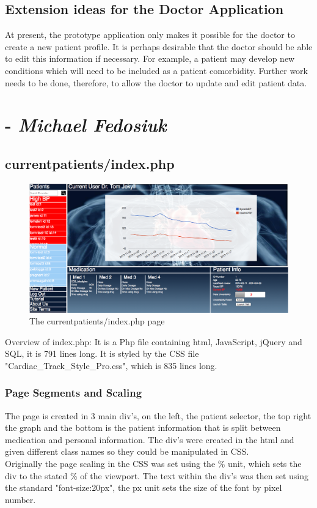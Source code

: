 \documentclass[11pt]{article}
\begin{document}

\subsection{Extension ideas for the Doctor Application}
At present, the prototype application only makes it possible for the doctor to create a new patient profile. It is perhaps desirable that the doctor should be able to edit this information if necessary. For example, a patient may develop new conditions which will need to be included as a patient comorbidity. Further work needs to be done, therefore, to allow the doctor to update and edit patient data.

\section{ - \textit{Michael Fedosiuk}}
\subsection{currentpatients/index.php}
\begin{figure}[h!] 
\includegraphics[width=\linewidth]{indexover.png}
\caption{The currentpatients/index.php page \label{indexover}}
\end{figure} 
\noindent 
Overview of index.php: It is a Php file containing html, JavaScript, jQuery and SQL, it is 791 lines long. It is styled by the CSS file "Cardiac\_Track\_Style\_Pro.css", which is 835 lines long. 
\subsubsection{Page Segments and Scaling}
The page is created in 3 main div's, on the left, the patient selector, the top right the graph and the bottom is the patient information that is split between medication and personal information. The div's were created in the html and given different class names so they could be manipulated in CSS. 
\\ \indent
Originally the page scaling in the CSS was set using the \% unit, which sets the div to the stated \% of the viewport. The text within the div's was then set using the standard "font-size:20px", the px unit sets the size of the font by pixel number. 
\end{document}
